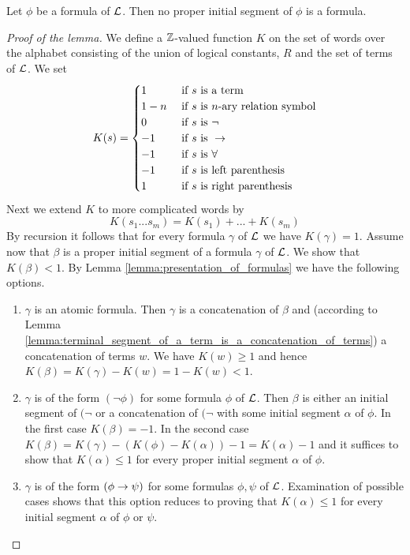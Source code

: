 \begin{lemma}\label{lemma:no_formula_is_a_proper_initial_segment_of_any_other_formula}
Let $\phi$ be a formula of ${\mathcal L}$. Then no proper initial segment of $\phi$ is a formula.
\end{lemma}
\begin{proof}[Proof of the lemma]
We define a ${\mathbb Z}$-valued function $K$ on the set of words over the alphabet consisting of the union of logical constants, $R$ and the set of terms of ${\mathcal L}$. We set
$$K(s) = \begin{cases}
1 & \mbox{ if }s\mbox{ is a term}\\
1-n & \mbox{ if }s\mbox{ is $n$-ary relation symbol}\\
0 & \mbox{ if }s\mbox{ is }\neg\\
-1 & \mbox{ if }s\mbox{ is }\rightarrow\\
-1 & \mbox{ if }s\mbox{ is }\forall\\
-1 & \mbox{ if }s\mbox{ is left parenthesis}\\
1 & \mbox{ if }s\mbox{ is right parenthesis}\\
\end{cases}$$
Next we extend $K$ to more complicated words by
$$K(s_1...s_m) = K(s_1) +...+ K(s_m)$$
By recursion it follows that for every formula $\gamma$ of ${\mathcal L}$ we have $K(\gamma) = 1$. Assume now that $\beta$ is a proper initial segment of a formula $\gamma$ of ${\mathcal L}$. We show that $K(\beta) < 1$. By Lemma \ref{lemma:presentation_of_formulas} we have the following options.
\begin{enumerate}[label=\textbf{(\arabic*)}, leftmargin=3.0em]
\item $\gamma$ is an atomic formula. Then $\gamma$ is a concatenation of $\beta$ and (according to Lemma \ref{lemma:terminal_segment_of_a_term_is_a_concatenation_of_terms}) a concatenation of terms $w$. We have $K(w) \geq 1$ and hence $K(\beta) = K(\gamma)- K(w) = 1 - K(w) < 1$.
\item $\gamma$ is of the form $(\neg \phi)$ for some formula $\phi$ of ${\mathcal L}$. Then $\beta$ is either an initial segment of $(\neg$ or a concatenation of $(\neg$ with some initial segment $\alpha$ of $\phi$. In the first case $K(\beta) = -1$. In the second case $K(\beta) = K(\gamma) - (K(\phi) - K(\alpha)) -1 = K(\alpha)-1$ and it suffices to show that $K(\alpha) \leq 1$ for every proper initial segment $\alpha$ of $\phi$.
\item $\gamma$ is of the form $(\phi \rightarrow \psi)$ for some formulas $\phi, \psi$ of ${\mathcal L}$. Examination of possible cases shows that this option reduces to proving that $K(\alpha) \leq 1$ for every initial segment $\alpha$ of $\phi$ or $\psi$.

\end{enumerate}
\end{proof}
